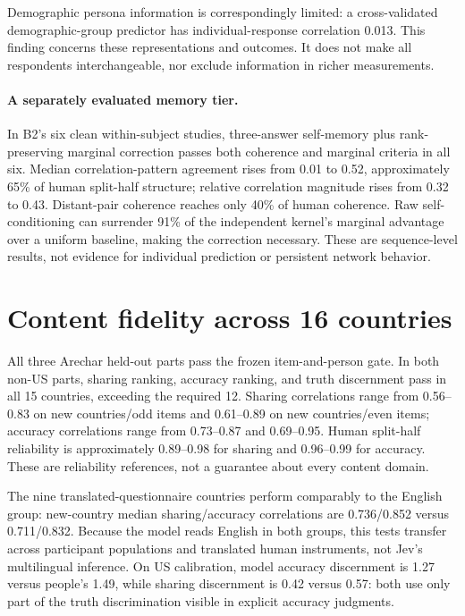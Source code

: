 \documentclass[11pt]{article}
\begin{document}
Demographic persona information is correspondingly limited: a cross-validated demographic-group predictor has individual-response correlation 0.013. This finding concerns these representations and outcomes. It does not make all respondents interchangeable, nor exclude information in richer measurements.

\paragraph{A separately evaluated memory tier.}
In B2's six clean within-subject studies, three-answer self-memory plus rank-preserving marginal correction passes both coherence and marginal criteria in all six. Median correlation-pattern agreement rises from 0.01 to 0.52, approximately 65\% of human split-half structure; relative correlation magnitude rises from 0.32 to 0.43. Distant-pair coherence reaches only 40\% of human coherence. Raw self-conditioning can surrender 91\% of the independent kernel's marginal advantage over a uniform baseline, making the correction necessary. These are sequence-level results, not evidence for individual prediction or persistent network behavior.

\section{Content fidelity across 16 countries}
All three Arechar held-out parts pass the frozen item-and-person gate. In both non-US parts, sharing ranking, accuracy ranking, and truth discernment pass in all 15 countries, exceeding the required 12. Sharing correlations range from 0.56--0.83 on new countries/odd items and 0.61--0.89 on new countries/even items; accuracy correlations range from 0.73--0.87 and 0.69--0.95. Human split-half reliability is approximately 0.89--0.98 for sharing and 0.96--0.99 for accuracy. These are reliability references, not a guarantee about every content domain.

The nine translated-questionnaire countries perform comparably to the English group: new-country median sharing/accuracy correlations are 0.736/0.852 versus 0.711/0.832. Because the model reads English in both groups, this tests transfer across participant populations and translated human instruments, not Jev's multilingual inference. On US calibration, model accuracy discernment is 1.27 versus people's 1.49, while sharing discernment is 0.42 versus 0.57: both use only part of the truth discrimination visible in explicit accuracy judgments.
\end{document}
